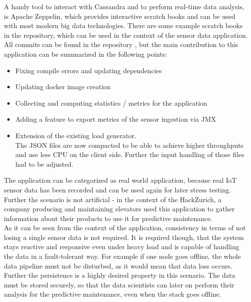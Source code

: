 A handy tool to interact with Cassandra and to perform real-time data analysis, is Apache Zeppelin, which provides interactive scratch books and can be used with most modern big data technologies.
There are some example scratch books in the repository, which can be used in the context of the sensor data application.\\

All commits can be found in the repository \cite{hackzurich}, but the main contribution to this application can be summarized in the following points:
\begin{itemize}
    \item Fixing compile errors and updating dependencies
    \item Updating docker image creation
    \item Collecting and computing statistics / metrics for the application
    \item Adding a feature to export metrics of the sensor ingestion via JMX
    \item Extension of the existing load generator.\\
          The JSON files are now compacted to be able to achieve higher throughputs and use less CPU on the client side.
          Further the input handling of those files had to be adjusted.
\end{itemize}

The application can be categorized as real world application, because real IoT sensor data has been recorded and can be used again for later stress testing.
Further the scenario is not artificial - in the context of the HackZurich, a company producing and maintaining elevators used this application to gather information about their products to use it for predictive maintenance.\\
As it can be seen from the context of the application, consistency in terms of not losing a single sensor data is not required.
It is required though, that the system stays reactive and responsive even under heavy load and is capable of handling the data in a fault-tolerant way.
For example if one node goes offline, the whole data pipeline must not be disturbed, as it would mean that data loss occurs.
Further the persistence is a highly desired property in this scenario.
The data must be stored securely, so that the data scientists can later on perform their analysis for the predictive maintenance, even when the stack goes offline.

